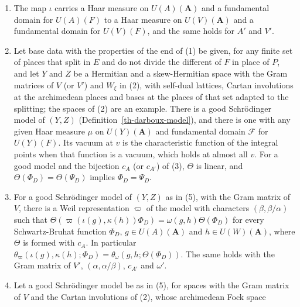 \begin{lemma}
\begin{enumerate}
  $M_{\operatorname{rk}W\times\operatorname{rk}S}(\mathbf A_E)$, the space
  $\mathbb W$ of the pairs $(-A,W)$ and $(A',W)$. The maps $\iota\colon g\mapsto\bar g$
  from $U(A)(\mathbf A)$ to $U(V)(\mathbf A)$ and from $U(A')(\mathbf A)$ to
  $U(V')(\mathbf A)$, and $\kappa\colon h\mapsto h$ from $U(W)(\mathbf A)$ to
  $U(W_\xi)(\mathbf A)$, are isomorphisms; $\iota$ carries the elements with
  components $1$ away from a finite place $v$ onto those of $U(V)(\mathbf A)$,
  and $\iota^{-1}$ carries them into $U(A)(\mathbf A_f)$; the same holds for
  $\kappa$.
\item The map $\iota$ carries a Haar measure on $U(A)(\mathbf A)$ and a
  fundamental domain for $U(A)(F)$ to a Haar measure on $U(V)(\mathbf A)$ and a
  fundamental domain for $U(V)(F)$, and the same holds for $A'$ and $V'$.
\item Let base data with the properties of the end of (1) be given, for any
  finite set of places that split in $E$ and do not divide the different of
  $F$ in place of $P$, and let $Y$ and $Z$ be a Hermitian and a skew-Hermitian
  space with the Gram matrices of $V$ (or $V'$) and $W_\xi$ in (2), with
  self-dual lattices, Cartan involutions at the archimedean places and bases at
  the places of that set adapted to the splitting; the spaces of (2) are an
  example. There is a good Schrödinger model of $(Y,Z)$
  (Definition~\ref{th-darboux-model}), and there is one with any given Haar
  measure $\mu$ on $U(Y)(\mathbf A)$ and fundamental domain $\mathcal F$ for
  $U(Y)(F)$. Its vacuum at $v$ is the characteristic function of the integral
  points when that function is a vacuum, which holds at almost all $v$. For a
  good model and the bijection $c_A$ (or $c_{A'}$) of (3), $\Theta$ is linear,
  and $\Theta(\Phi_D)=\Theta(\Psi_D)$ implies $\Phi_D=\Psi_D$.
\item For a good Schrödinger model of $(Y,Z)$ as in (5), with the Gram matrix
  of $V$, there is a Weil representation $\varpi$ of the model with characters
  $(\beta,\beta/\alpha)$ such that
  $\Theta(\varpi(\iota(g),\kappa(h))\Phi_D)=\omega(g,h)\Theta(\Phi_D)$ for
  every Schwartz-Bruhat function $\Phi_D$, $g\in U(A)(\mathbf A)$ and
  $h\in U(W)(\mathbf A)$, where $\Theta$ is formed with $c_A$. In particular
  $\theta_\varpi(\iota(g),\kappa(h);\Phi_D)=\theta_\omega(g,h;\Theta(\Phi_D))$.
  The same holds with the Gram matrix of $V'$, $(\alpha,\alpha/\beta)$,
  $c_{A'}$ and $\omega'$.
\item Let a good Schrödinger model be as in (5), for spaces with the Gram
  matrix of $V$ and the Cartan involutions of (2), whose archimedean Fock space

\end{enumerate}
\end{lemma}
